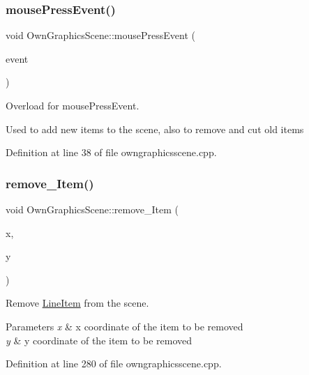 \subsubsection{\texorpdfstring{mouse\+Press\+Event()}{mousePressEvent()}}
{\footnotesize\ttfamily void Own\+Graphics\+Scene\+::mouse\+Press\+Event (\begin{DoxyParamCaption}\item[{Q\+Graphics\+Scene\+Mouse\+Event $\ast$}]{event }\end{DoxyParamCaption})}



Overload for mouse\+Press\+Event. 

Used to add new items to the scene, also to remove and cut old items 

Definition at line 38 of file owngraphicsscene.\+cpp.

\mbox{\label{classOwnGraphicsScene_a5b4b466a697f83c23294a80067edac23}} 
\subsubsection{\texorpdfstring{remove\+\_\+\+Item()}{remove\_Item()}}
{\footnotesize\ttfamily void Own\+Graphics\+Scene\+::remove\+\_\+\+Item (\begin{DoxyParamCaption}\item[{unsigned}]{x,  }\item[{unsigned}]{y }\end{DoxyParamCaption})}



Remove \mbox{\hyperlink{classLineItem}{Line\+Item}} from the scene. 


\begin{DoxyParams}{Parameters}
{\em x} & x coordinate of the item to be removed \\
\hline
{\em y} & y coordinate of the item to be removed \\
\hline
\end{DoxyParams}


Definition at line 280 of file owngraphicsscene.\+cpp.

\mbox{\label{classOwnGraphicsScene_a24d8270608b0bd56c6155d99d7722ab8}} 
